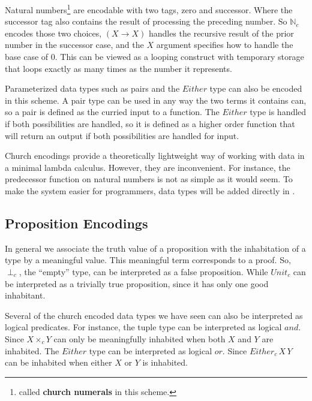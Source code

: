 Natural numbers\footnote{called \textbf{church numerals} in this scheme.} are encodable with two tags, zero and successor.
Where the successor tag also contains the result of processing the preceding number.
So $\mathbb{N}_{c}$ encodes those two choices, $(X\rightarrow X)$ handles the recursive result of the prior number in the successor case, and the $X$ argument specifies how to handle the base case of $0$.
This can be viewed as a looping construct with temporary storage that loops exactly as many times as the number it represents.

Parameterized data types such as pairs and the $Either$ type can also be encoded in this scheme.
A pair type can be used in any way the two terms it contains can, so a pair is defined as the curried input to a function.
The $Either$ type is handled if both possibilities are handled, so it is defined as a higher order function that will return an output if both possibilities are handled for input.


Church encodings provide a theoretically lightweight way of working with data in a minimal lambda calculus.
However, they are inconvenient.
For instance, the predecessor function on natural numbers is not as simple as it would seem.
To make the system easier for programmers, data types will be added directly in .

\subsection{Proposition Encodings}


In general we associate the truth value of a proposition with the inhabitation of a type by a meaningful value.
This meaningful term corresponds to a proof.
So, $\perp_{c}$, the ``empty'' type, can be interpreted as a false proposition.
While $Unit_{c}$ can be interpreted as a trivially true proposition, since it has only one good inhabitant.

Several of the church encoded data types we have seen can also be interpreted as logical predicates.
For instance, the tuple type can be interpreted as logical $and$.
Since $X\times_{c}Y$ can only be meaningfully inhabited when both $X$ and $Y$ are inhabited.
The $Either$ type can be interpreted as logical $or$.
Since $Either_{c}\,X\,Y$ can be inhabited when either $X$ or $Y$ is inhabited.

